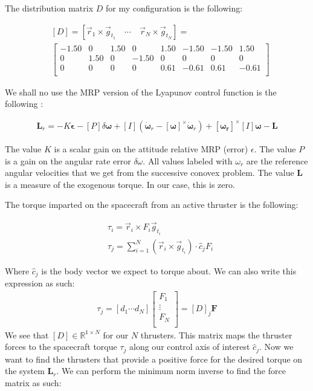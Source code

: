 The distribution matrix $D$ for my configuration is the following:

\begin{align*}
& \left[D \right] = \left[\vec{r}_1 \times \vec{g}_{t_1} \quad \cdots \quad \vec{r}_N\times \vec{g}_{t_N}\right]  = \\
&\begin{bmatrix}
   -1.50   &      0   & 1.50  &       0  &  1.50  & -1.50 &  -1.50  &  1.50 \\
         0   & 1.50   &      0  & -1.50  &       0  &       0 &        0  &       0 \\
         0   &      0   &      0  &       0  &  0.61  & -0.61 &   0.61  & -0.61 \\
\end{bmatrix}
\end{align*}

We shall no use the MRP version of the Lyapunov control function is the following \cite{sj}:

\begin{align}
\mathbf{L}_r = -K\mathbf{\epsilon} - \left[P\right]\delta\mathbf{\omega} +
\left[I\right](\dot{\mathbf{\omega}}_r - \left[\mathbf{\omega}\right]^{\times}\dot{\mathbf{\omega}}_r) + \left[\mathbf{\omega_r}\right]^{\times}\left[I\right]\mathbf{\omega} - \mathbf{L}
\end{align}

The value $K$ is a scalar gain on the attitude relative MRP (error) $\epsilon$. The value $P$ is a gain on the angular rate error $\delta\omega$. All values labeled with $\omega_{r}$ are the reference angular velocities that we get from the successive conovex problem. The value $\mathbf{L}$ is a measure of the exogenous torque. In our case, this is zero.

The torque imparted on the spacecraft from an active thruster is the following:

\begin{align}
& \tau_i = \vec{r}_i \times F_i \vec{g}_{t_i} \\
& \tau_j = \sum _{i=1}^{N} (\vec{r}_i \times \vec{g}_{t_i}) \cdot \hat{c}_j F_i
\end{align}

Where $\hat{c}_j$ is the body vector we expect to torque about. We can also write this expression as such:
\begin{align}
\tau_j = \left[ d_1 \cdots d_N \right]
	\begin{bmatrix}
		F_1 \\
		\vdots \\
		F_N \\
 	\end{bmatrix}
= \left[D\right]_j\mathbf{F}
\end{align}
We see that $\left[D\right] \in \mathbb{R}^{1\times N}$ for our $N$ thrusters. This matrix maps the thruster forces to the spacecraft torque $\tau_j$ along our control axis of interest $\hat{c}_j$. Now we want to find the thrusters that provide a positive force for the desired torque on the system $\mathbf{L}_r$. We can perform the minimum norm  inverse to find the force matrix as such:

